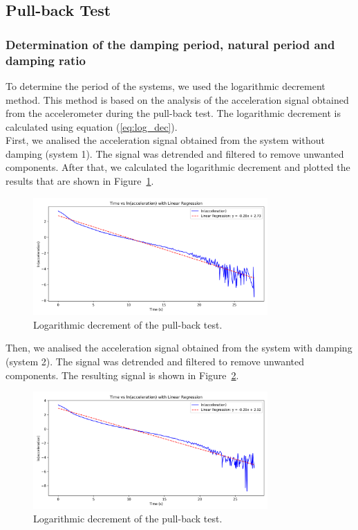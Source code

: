 \documentclass{article}  %
\begin{document}
\subsection{Pull-back Test}
\subsubsection{Determination of the damping period, natural period and damping ratio}
To determine the period of the systems, we used the logarithmic decrement method. This method is based on the analysis of the acceleration signal obtained from the accelerometer during the pull-back test. The logarithmic decrement is calculated using equation (\ref{eq:log_dec}).\\
First, we analised the acceleration signal obtained from the system without damping (system 1). The signal was detrended and filtered to remove unwanted components. After that, we calculated the logarithmic decrement and plotted the results that are shown in Figure~\ref{fig:pullback1}.



\begin{figure}[h]
  \centering
  \includegraphics[width=0.8\textwidth]{GRAFICOS/regresion_lineal_first.png}
  \caption{Logarithmic decrement of the pull-back test.}
  \label{fig:pullback1}  
\end{figure}

Then, we analised the acceleration signal obtained from the system with damping (system 2). The signal was detrended and filtered to remove unwanted components. The resulting signal is shown in Figure~\ref{fig:pullback2}.

\begin{figure}[h]
  \centering
  \includegraphics[width=0.8\textwidth]{GRAFICOS/regresion_lineal_second.png}
  \caption{Logarithmic decrement of the pull-back test.}
  \label{fig:pullback2}  
\end{figure}
\end{document}
